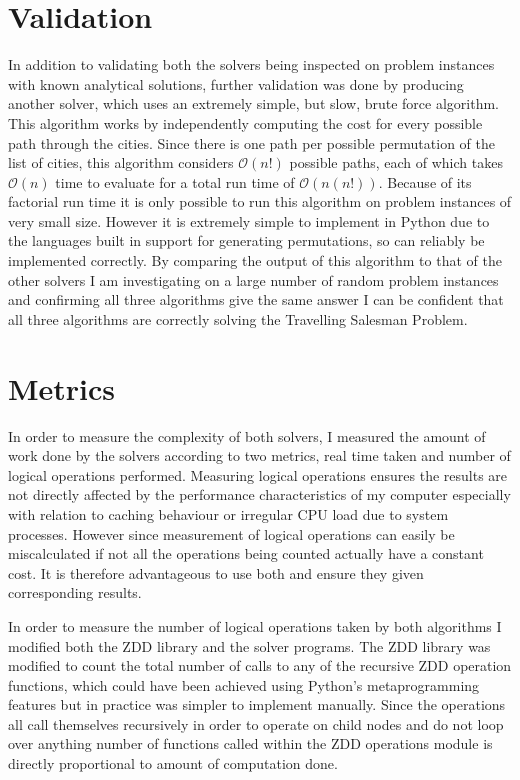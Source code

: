 \documentclass[12pt,a4paper,twoside,openright]{report}
\begin{document}
\section{Validation}
In addition to validating both the solvers being inspected on problem instances with known analytical solutions, further validation was done by producing another solver, which uses an extremely simple, but slow, brute force algorithm. This algorithm works by independently computing the cost for every possible path through the cities. Since there is one path per possible permutation of the list of cities, this algorithm considers $\mathcal{O}(n!)$ possible paths, each of which takes $\mathcal{O}(n)$ time to evaluate for a total run time of $\mathcal{O}(n(n!))$. Because of its factorial run time it is only possible to run this algorithm on problem instances of very small size. However it is extremely simple to implement in Python due to the languages built in support for generating permutations, so can reliably be implemented correctly. By comparing the output of this algorithm to that of the other solvers I am investigating on a large number of random problem instances and confirming all three algorithms give the same answer I can be confident that all three algorithms are correctly solving the Travelling Salesman Problem.

\section{Metrics}
In order to measure the complexity of both solvers, I measured the amount of work done by the solvers according to two metrics, real time taken and number of logical operations performed. Measuring logical operations ensures the results are not directly affected by the performance characteristics of my computer especially with relation to caching behaviour or irregular CPU load due to system processes. However since measurement of logical operations can easily be miscalculated if not all the operations being counted actually have a constant cost. It is therefore advantageous to use both and ensure they given corresponding results.

In order to measure the number of logical operations taken by both algorithms I modified both the ZDD library and the solver programs. The ZDD library was modified to count the total number of calls to any of the recursive ZDD operation functions, which could have been achieved using Python's metaprogramming features but in practice was simpler to implement manually. Since the operations all call themselves recursively in order to operate on child nodes and do not loop over anything number of functions called within the ZDD operations module is directly proportional to amount of computation done.
\end{document}
